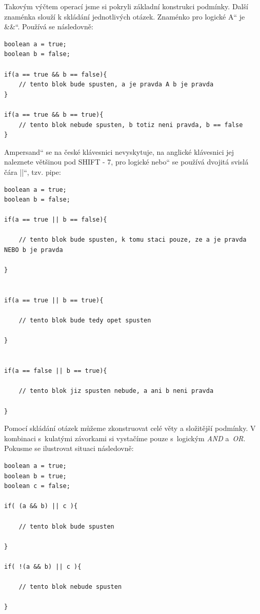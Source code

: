 \documentclass[10pt,twoside=true,open=right,cleardoublepage=empty,chapterprefix=true]{scrbook}
\renewcommand\uv[1]{\quotedblbase #1\textquotedblleft}%
\newcommand{\klavesy}[1]{\textsc{#1}}
\begin{document}
Takovým výčtem operací jsme si pokryli základní konstrukci podmínky. Další znaménka slouží k skládání jednotlivých otázek. Znaménko pro logické \uv{A} je \uv{\&\&}. Používá se následovně:

\begin{lstlisting}
boolean a = true;
boolean b = false;

if(a == true && b == false){
	// tento blok bude spusten, a je pravda A b je pravda
}

if(a == true && b == true){
	// tento blok nebude spusten, b totiz neni pravda, b == false
}

\end{lstlisting}


\uv{Ampersand} se na české klávesnici nevyskytuje, na anglické klávesnici jej naleznete většinou pod \klavesy {SHIFT - 7}, pro logické \uv{nebo} se používá dvojitá svislá čára \uv{||}, tzv. pipe:

\begin{lstlisting}
boolean a = true;
boolean b = false;

if(a == true || b == false){

	// tento blok bude spusten, k tomu staci pouze, ze a je pravda NEBO b je pravda

}


if(a == true || b == true){

	// tento blok bude tedy opet spusten

}


if(a == false || b == true){

	// tento blok jiz spusten nebude, a ani b neni pravda 

}

\end{lstlisting}

Pomocí skládání otázek můžeme zkonstruovat celé věty a složitější podmínky. V kombinaci s~kulatými závorkami si vystačíme pouze s~logickým {\em AND} a~{\em OR}. Pokusme se ilustrovat situaci následovně:


\begin{lstlisting}
boolean a = true;
boolean b = true;
boolean c = false;

if( (a && b) || c ){

	// tento blok bude spusten
	
}

if( !(a && b) || c ){

	// tento blok nebude spusten
	
}

\end{lstlisting}
\end{document}
